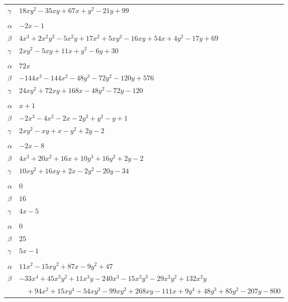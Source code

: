 \documentclass[11pt]{article}
\begin{document}
\begin{longtable}{@{}ll@{}}
$\gamma$ & $18xy^{2}-35xy+67x+y^{2}-21y+99$\\
\addlinespace[3pt]
\multicolumn{2}{@{}l}{$\{i,j\}=\{44,66\}$, $k_{ij}=2\cdot 3^{2}\cdot 7$}\\
$\alpha$ & $-2x-1$\\
$\beta$ & $4x^{3}+2x^{2}y^{2}-5x^{2}y+17x^{2}+5xy^{2}-16xy+54x+4y^{2}-17y+69$\\
$\gamma$ & $2xy^{2}-5xy+11x+y^{2}-6y+30$\\
\addlinespace[3pt]
\multicolumn{2}{@{}l}{$\{i,j\}=\{44,67\}$, $k_{ij}=2^{6}\cdot 3^{2}$}\\
$\alpha$ & $72x$\\
$\beta$ & $-144x^{3}-144x^{2}-48y^{3}-72y^{2}-120y+576$\\
$\gamma$ & $24xy^{2}+72xy+168x-48y^{2}-72y-120$\\
\addlinespace[3pt]
\multicolumn{2}{@{}l}{$\{i,j\}=\{44,69\}$, $k_{ij}=2\cdot 3$}\\
$\alpha$ & $x+1$\\
$\beta$ & $-2x^{3}-4x^{2}-2x-2y^{3}+y^{2}-y+1$\\
$\gamma$ & $2xy^{2}-xy+x-y^{2}+2y-2$\\
\addlinespace[3pt]
\multicolumn{2}{@{}l}{$\{i,j\}=\{44,71\}$, $k_{ij}=2\cdot 3\cdot 7$}\\
$\alpha$ & $-2x-8$\\
$\beta$ & $4x^{3}+20x^{2}+16x+10y^{3}+16y^{2}+2y-2$\\
$\gamma$ & $10xy^{2}+16xy+2x-2y^{2}-20y-34$\\
\addlinespace[3pt]
\multicolumn{2}{@{}l}{$\{i,j\}=\{44,188\}$, $k_{ij}=3\cdot 7$}\\
$\alpha$ & $0$\\
$\beta$ & $16$\\
$\gamma$ & $4x-5$\\
\addlinespace[3pt]
\multicolumn{2}{@{}l}{$\{i,j\}=\{44,189\}$, $k_{ij}=3\cdot 7$}\\
$\alpha$ & $0$\\
$\beta$ & $25$\\
$\gamma$ & $5x-1$\\
\addlinespace[3pt]
\multicolumn{2}{@{}l}{$\{i,j\}=\{45,53\}$, $k_{ij}=7\cdot 43$}\\
$\alpha$ & $11x^{2}-15xy^{2}+87x-9y^{2}+47$\\
$\beta$ & $-33x^{4}+45x^{3}y^{2}+11x^{3}y-240x^{3}-15x^{2}y^{3}-29x^{2}y^{2}+132x^{2}y$\\
 & $\quad +94x^{2}+15xy^{4}-54xy^{3}-99xy^{2}+268xy-111x+9y^{4}+48y^{3}+85y^{2}-207y-800$\\

\end{longtable}
\end{document}
